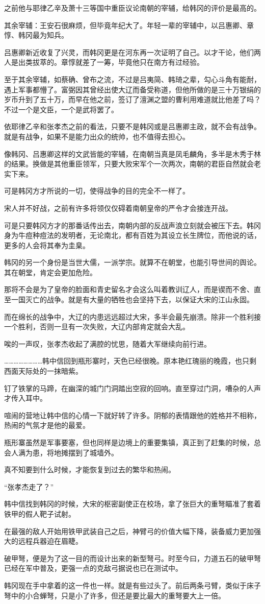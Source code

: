 之前他与耶律乙辛及萧十三等国中重臣议论南朝的宰辅，给韩冈的评价是最高的。

其余宰辅：王安石很麻烦，但毕竟年纪大了。年轻一辈的宰辅中，以吕惠卿、章惇、韩冈最为知兵。

吕惠卿新近收复了兴灵，而韩冈更是在河东再一次证明了自己。以才干论，他们两人是出类拔萃的。章惇就差了一筹，毕竟他只在南方有过经验。

至于其余宰辅，如蔡确、曾布之流，不过是吕夷简、韩琦之辈，勾心斗角有能耐，遇上军事都懵了。富弼因其曾经出使大辽而备受称道，但他所做的是三十万银绢的岁币升到了五十万，而早在他之前，签订了澶渊之盟的曹利用难道就比他差了吗？不过一个是文臣，一个是武将罢了。

依耶律乙辛和张孝杰之前的看法，只要不是韩冈或是吕惠卿主政，就不会有战争。就是有战争，如果不是能力出众的统帅，也不值得去担心。

像韩冈、吕惠卿这样的文武皆能的宰辅，在南朝当真是凤毛麟角，多半是木秀于林的结果。换做是其他重臣领军，只要大败宋军个一次两次，南朝的君臣自然就会老实下来。

可是韩冈方才所说的一切，使得战争的目的完全不一样了。

宋人并不好战，之前有许多将领仅仅碍着南朝皇帝的严令才会接连开战。

可是只要韩冈方才的那番话传出去，南朝内部的反战声浪立刻就会被压下去。韩冈身为牛痘种痘法的发明者，无论南北，都有百姓为其设立长生牌位，而他说的话，更多的人会将其奉为圭臬。

韩冈的另一个身份是当世大儒，一派学宗。就算不在朝堂，也能引导世间的舆论。其在朝堂，肯定会更加危险。

那将不会是为了皇帝的脸面和青史留名才会这么叫着教训辽人，而是锲而不舍、直至一国灭亡的战争。就是有大量的牺牲也会坚持下去，以保证大宋的江山永固。

而在绵长的战争中，大辽的内患远远超过大宋，多半会最先崩溃。除非一个胜利接一个胜利，否则一旦有一次失败，大辽内部肯定就会大乱。

唉的一声叹，张孝杰收起了满腔的忧思，随着大军继续向前行进。

……………………韩中信回到瓶形寨时，天色已经很晚。原本艳红瑰丽的晚霞，也只剩西面天际处的一抹暗紫。

钉了铁掌的马蹄，在幽深的城门门洞踏出空寂的回响。直至穿过门洞，嘈杂的人声才传入耳中。

喧闹的营地让韩中信的心情一下就好转了许多。阴郁的表情跟他的姓格并不相称，热闹的气氛才是他的最爱。

瓶形寨虽然是军事要塞，但也同样是边境上的重要集镇，真正到了赶集的时候，总会人满为患，将地摊摆到了城墙外。

真不知要到什么时候，才能恢复到过去的繁华和热闹。

“张孝杰走了？”

韩中信找到韩冈的时候，大宋的枢密副使正在校场，拿了张巨大的重弩瞄准了套着铁甲的假人靶子试射。

在最强的敌人开始用铁甲武装自己之后，神臂弓的价值大幅下降，装备威力更加强大的远程兵器迫在眉睫。

破甲弩，便是为了这一目的而设计出来的新型弩弓。时至今曰，力道五石的破甲弩已经在军中普及，更强一点的克敌弓据说也已在测试中。

韩冈现在手中拿着的这一件也一样。就是有些过头了。前后两条弓臂，类似于床子弩中的小合蝉弩，只是小了许多，但还是要比最大的重弩要大上一倍。
